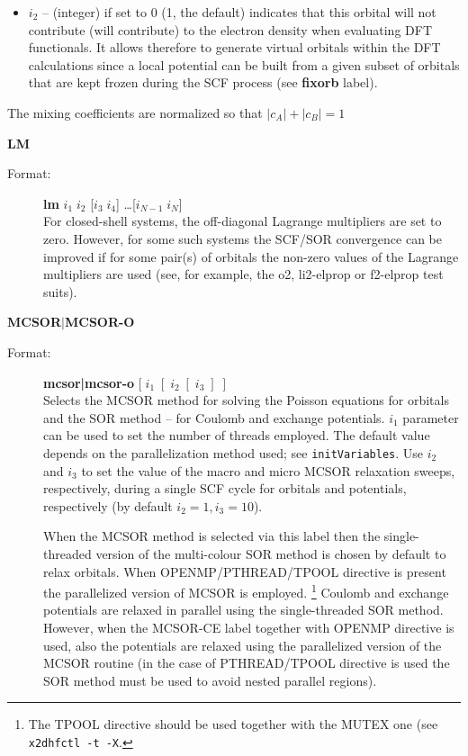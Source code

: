 \documentclass[10pt,a4paper]{article}
\newcommand{\ft}[1]{\texttt{#1}}
\newcommand{\fb}[1]{\textbf{#1}}
\begin{document}
\begin{description}
\begin{description}
\begin{description}
\begin{itemize}
\item[] $i_2$ -- (integer) if set to 0 (1, the default) indicates that this
  orbital will not contribute (will contribute) to the electron density
  when evaluating DFT functionals. It allows therefore to generate
  virtual orbitals within the DFT calculations since a local potential can
  be built from a given subset of orbitals that are kept frozen during the
  SCF process (see \fb{fixorb} label).

\end{itemize}
The mixing coefficients are normalized so that $|c_A|+|c_B|=1$

\end{description}
\end{description}

\item \textbf{LM}
\begin{description}
\item[Format:] \textbf{lm} $i_1 \; i_2$ [\;$i_3 \;i_4$\;] \ldots [\;$i_{N-1} \;i_{N}$\;] \\
  For closed-shell systems, the off-diagonal Lagrange multipliers are set to
  zero. However, for some such systems the SCF/SOR convergence can be
  improved if for some pair(s) of orbitals the non-zero values of the
  Lagrange multipliers are used (see, for example, the o2, li2-elprop or
  f2-elprop test suits).
\end{description}

\item \textbf{MCSOR$|$MCSOR-O}
\begin{description}
\item[Format:] \textbf{mcsor|mcsor-o} $[\;i_1\;[\;i_2\;[\;i_3\;]\;]$\\
  Selects the MCSOR method for solving the Poisson equations for orbitals
  and the SOR method -- for Coulomb and exchange potentials. $i_1$
  parameter can be used to set the number of threads employed. The default
  value depends on the parallelization method used; see
  \ft{initVariables}. Use $i_2$ and $i_3$ to set the value of the 
  macro and micro MCSOR relaxation sweeps, respectively, during a single SCF
  cycle for orbitals and potentials, respectively (by default
  $i_2=1, i_3=10$).

  When the MCSOR method is selected via this label then the single-threaded
  version of the multi-colour SOR method is chosen by default to relax
  orbitals. When OPENMP/PTHREAD/TPOOL directive is present the parallelized
  version of MCSOR is employed.%
  \footnote{The TPOOL directive should be used together with the MUTEX one
    (see \ft{x2dhfctl -t -X}.}  Coulomb and exchange potentials are relaxed
  in parallel using the single-threaded SOR method. However, when the
  MCSOR-CE label together with OPENMP directive is used, also the
  potentials are relaxed using the parallelized version of the MCSOR
  routine (in the case of PTHREAD/TPOOL directive is used the SOR method
  must be used to avoid nested parallel regions).


\end{description}
\end{description}
\end{document}
